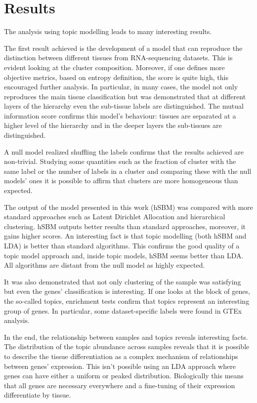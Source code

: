 \section{Results}\label{sec:topic/results}
The analysis using topic modelling leads to many interesting results.

The first result achieved is the development of a model that can reproduce the distinction between different tissues from RNA-sequencing datasets. This is evident looking at the cluster composition. Moreover, if one defines more objective metrics, based on entropy definition, the score is quite high, this encouraged further analysis. In particular, in many cases, the model not only reproduces the main tissue classification but was demonstrated that at different layers of the hierarchy even the sub-tissue labels are distinguished. The mutual information score confirms this model's behaviour: tissues are separated at a higher level of the hierarchy and in the deeper layers the sub-tissues are distinguished.

A null model realized shuffling the labels confirms that the results achieved are non-trivial. Studying some quantities such as the fraction of cluster with the same label or the number of labels in a cluster and comparing these with the null models' ones it is possible to affirm that clusters are more homogeneous than expected.

The output of the model presented in this work (hSBM) was compared with more standard approaches such as Latent Dirichlet Allocation and hierarchical clustering. hSBM outputs better results than standard approaches, moreover, it gains higher scores. An interesting fact is that topic modelling (both hSBM and LDA) is better than standard algorithms. This confirms the good quality of a topic model approach and, inside topic models, hSBM seems better than LDA. All algorithms are distant from the null model as highly expected.

It was also demonstrated that not only clustering of the sample was satisfying but even the genes' classification is interesting. If one looks at the block of genes, the so-called topics, enrichment tests confirm that topics represent an interesting group of genes. In particular, some dataset-specific labels were found in GTEx analysis.

In the end, the relationship between samples and topics reveals interesting facts. The distribution of the topic abundance across samples reveals that it is possible to describe the tissue differentiation as a complex mechanism of relationships between genes' expression. This isn't possible using an LDA approach where genes can have either a uniform or peaked distribution. Biologically this means that all genes are necessary everywhere and a fine-tuning of their expression differentiate by tissue.

